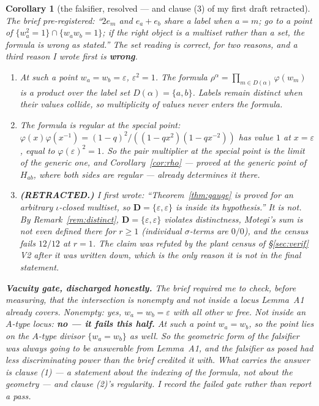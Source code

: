 \documentclass[11pt]{article}
\newtheorem{cor}[thm]{Corollary}
\theoremstyle{definition}
\newcommand{\bD}{\mathbf{D}}
\begin{document}
\begin{cor}[the falsifier, resolved --- and clause (3) of my first draft retracted]
\label{cor:falsifier}
The brief pre-registered: ``$2e_m$ and $e_a+e_b$ share a label when $a=m$; go to
a point of $\{w_a^{2}=1\}\cap\{w_aw_b=1\}$; if the right object is a multiset
rather than a set, the formula is wrong as stated.''  The set reading is correct,
for two reasons, and a third reason I wrote first is \textbf{wrong}.
\begin{enumerate}
\item At such a point $w_a=w_b=\varepsilon$, $\varepsilon^2=1$.  The formula
  $\rho^{\alpha}=\prod_{m\in D(\alpha)}\varphi(w_m)$ is a product over the
  \emph{label set} $D(\alpha)=\{a,b\}$.  Labels remain distinct when their values
  collide, so multiplicity of \emph{values} never enters the formula.
\item The formula is \emph{regular} at the special point:
  $\varphi(x)\varphi(x^{-1})=(1-q)^2/((1-qx^{2})(1-qx^{-2}))$ has value $1$ at
  $x=\varepsilon$, equal to $\varphi(\varepsilon)^{2}=1$.  So the pair
  multiplier at the special point is the limit of the generic one, and
  Corollary~\ref{cor:rho} --- proved at the generic point of $H_{ab}$, where both
  sides are regular --- already determines it there.
\item\textbf{\textup{(RETRACTED.)}}  I first wrote: ``Theorem~\ref{thm:gauge} is
  proved for an arbitrary $\iota$-closed \emph{multiset}, so
  $\bD=\{\varepsilon,\varepsilon\}$ is inside its hypothesis.''  It is not.  By
  Remark~\ref{rem:distinct}, $\bD=\{\varepsilon,\varepsilon\}$ violates
  distinctness, Motegi's sum is not even defined there for $r\ge1$ (individual
  $\sigma$-terms are $0/0$), and the census fails $12/12$ at $r=1$.  The claim was
  refuted by the plant census of \S\ref{sec:verif} V2 after it was written down,
  which is the only reason it is not in the final statement.
\end{enumerate}
\textbf{Vacuity gate, discharged honestly.}  The brief required me to check,
before measuring, that the intersection is nonempty and not inside a locus
Lemma~A1 already covers.  Nonempty: yes, $w_a=w_b=\varepsilon$ with all other
$w$ free.  Not inside an $A$-type locus: \textbf{no --- it fails this half.}  At
such a point $w_a=w_b$, so the point lies on the $A$-type divisor
$\{w_a=w_b\}$ as well.  So the geometric form of the falsifier was always going
to be answerable from Lemma~A1, and the falsifier as posed had less
discriminating power than the brief credited it with.  What carries the answer is
clause (1) --- a statement about the indexing of the formula, not about the
geometry --- and clause (2)'s regularity.  I record the failed gate rather than
report a pass.
\end{cor}
\end{document}
